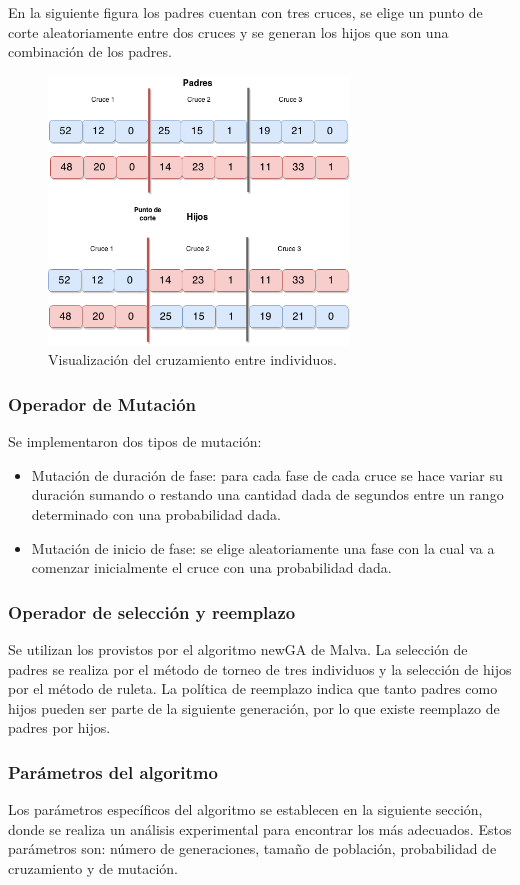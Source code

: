 En la siguiente figura los padres cuentan con tres cruces, se elige un punto de corte aleatoriamente entre dos cruces y se generan los hijos que son una combinación de los padres.

\begin{figure}[H]
	\centering
	\includegraphics[width=8cm]{Figures/alg_cruzamiento}
	\caption{Visualización del cruzamiento entre individuos.}
	\label{fig:op_cruzamiento}
\end{figure}


\newpage
\subsubsection{Operador de Mutación}
Se implementaron dos tipos de mutación:
\begin{itemize}

\item Mutación de duración de fase: para cada fase de cada cruce se
hace variar su duración sumando o restando una cantidad dada
de segundos entre un rango determinado con una probabilidad
dada.
\item Mutación de inicio de fase: se elige aleatoriamente una fase
con la cual va a comenzar inicialmente el cruce con una probabilidad dada.

\end{itemize}

\subsubsection{Operador de selección y reemplazo}
Se  utilizan los provistos por el algoritmo newGA de Malva. La selección de padres se realiza por el método de torneo de tres individuos y la selección de hijos por el método de ruleta. La política de reemplazo indica que tanto padres como hijos pueden ser parte de la siguiente generación, por lo que existe reemplazo de padres por hijos.

\subsubsection{Parámetros del algoritmo}
Los parámetros específicos del algoritmo se establecen en la siguiente sección, donde se realiza un análisis experimental para encontrar los más adecuados. Estos parámetros son: número de generaciones, tamaño de población, probabilidad de cruzamiento y de mutación.